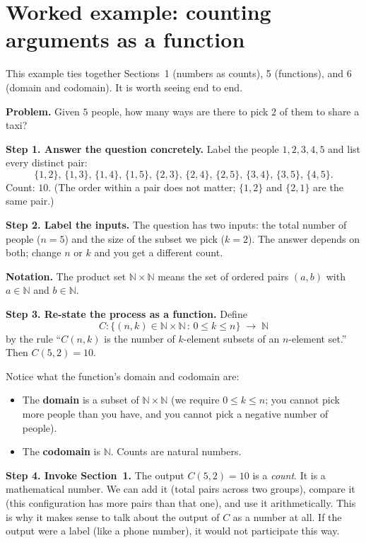 \section{Worked example: counting arguments as a function}

This example ties together Sections~1 (numbers as counts), 5 (functions), and 6 (domain and codomain). It is worth seeing end to end.

\textbf{Problem.} Given $5$ people, how many ways are there to pick $2$ of them to share a taxi?

\textbf{Step 1. Answer the question concretely.} Label the people $1, 2, 3, 4, 5$ and list every distinct pair:
\[
  \{1,2\},\, \{1,3\},\, \{1,4\},\, \{1,5\},\, \{2,3\},\, \{2,4\},\, \{2,5\},\, \{3,4\},\, \{3,5\},\, \{4,5\}.
\]
Count: $10$. (The order within a pair does not matter; $\{1,2\}$ and $\{2,1\}$ are the same pair.)

\textbf{Step 2. Label the inputs.} The question has two inputs: the total number of people ($n = 5$) and the size of the subset we pick ($k = 2$). The answer depends on both; change $n$ or $k$ and you get a different count.

\textbf{Notation.} The product set $\mathbb{N} \times \mathbb{N}$ means the set of ordered pairs $(a,b)$ with $a \in \mathbb{N}$ and $b \in \mathbb{N}$.

\textbf{Step 3. Re-state the process as a function.} Define
\[
  C \colon \{(n, k) \in \mathbb{N} \times \mathbb{N} \,:\, 0 \leq k \leq n\} \;\longrightarrow\; \mathbb{N}
\]
by the rule ``$C(n, k)$ is the number of $k$-element subsets of an $n$-element set.'' Then $C(5, 2) = 10$.

Notice what the function's domain and codomain are:
\begin{itemize}
  \item The \textbf{domain} is a subset of $\mathbb{N} \times \mathbb{N}$ (we require $0 \leq k \leq n$; you cannot pick more people than you have, and you cannot pick a negative number of people).
  \item The \textbf{codomain} is $\mathbb{N}$. Counts are natural numbers.
\end{itemize}

\textbf{Step 4. Invoke Section~1.} The output $C(5, 2) = 10$ is a \emph{count}. It is a mathematical number. We can add it (total pairs across two groups), compare it (this configuration has more pairs than that one), and use it arithmetically. This is why it makes sense to talk about the output of $C$ as a number at all. If the output were a label (like a phone number), it would not participate this way.

